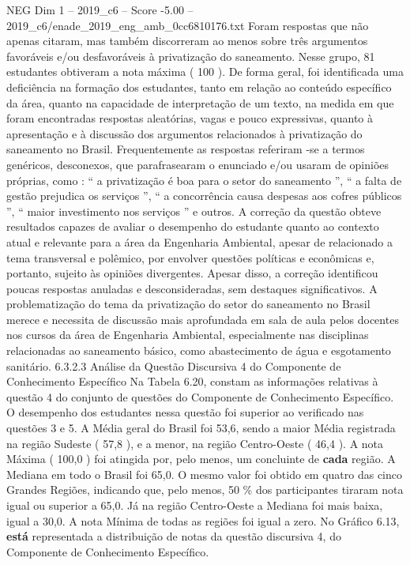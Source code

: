 \begin{textsample}{NEG Dim 1 – 2019\_c6 – Score -5.00 – 2019\_c6/enade\_2019\_eng\_amb\_0cc6810176.txt}
Foram respostas que não apenas citaram, mas também discorreram ao menos sobre três argumentos favoráveis e/ou desfavoráveis à privatização do saneamento.
Nesse grupo, 81 estudantes obtiveram a nota máxima ( 100 ).
De forma geral, foi identificada uma deficiência na formação dos estudantes, tanto em relação ao conteúdo específico da área, quanto na capacidade de interpretação de um texto, na medida em que foram encontradas respostas aleatórias, vagas e pouco expressivas, quanto à apresentação e à discussão dos argumentos relacionados à privatização do saneamento no Brasil.
Frequentemente as respostas referiram -se a termos genéricos, desconexos, que parafrasearam o enunciado e/ou usaram de opiniões próprias, como : “ a privatização é boa para o setor do saneamento ”, “ a falta de gestão prejudica os serviços ”, “ a concorrência causa despesas aos cofres públicos ”, “ maior investimento nos serviços ” e outros.
A correção da questão obteve resultados capazes de avaliar o desempenho do estudante quanto ao contexto atual e relevante para a área da Engenharia Ambiental, apesar de relacionado a tema transversal e polêmico, por envolver questões políticas e econômicas e, portanto, sujeito às opiniões divergentes.
Apesar disso, a correção identificou poucas respostas anuladas e desconsideradas, sem destaques significativos.
A problematização do tema da privatização do setor do saneamento no Brasil merece e necessita de discussão mais aprofundada em sala de aula pelos docentes nos cursos da área de Engenharia Ambiental, especialmente nas disciplinas relacionadas ao saneamento básico, como abastecimento de água e esgotamento sanitário. 6.3.2.3 Análise da Questão Discursiva 4 do Componente de Conhecimento Específico Na Tabela 6.20, constam as informações relativas à questão 4 do conjunto de questões do Componente de Conhecimento Específico.
O desempenho dos estudantes nessa questão foi superior ao verificado nas questões 3 e 5.
A Média geral do Brasil foi 53,6, sendo a maior Média registrada na região Sudeste ( 57,8 ), e a menor, na região Centro-Oeste ( 46,4 ).
A nota Máxima ( 100,0 ) foi atingida por, pelo menos, um concluinte de \textbf{cada} região.
A Mediana em todo o Brasil foi 65,0.
O mesmo valor foi obtido em quatro das cinco Grandes Regiões, indicando que, pelo menos, 50 \% dos participantes tiraram nota igual ou superior a 65,0.
Já na região Centro-Oeste a Mediana foi mais baixa, igual a 30,0.
A nota Mínima de todas as regiões foi igual a zero.
No Gráfico 6.13, \textbf{está} representada a distribuição de notas da questão discursiva 4, do Componente de Conhecimento Específico.

\end{textsample}
